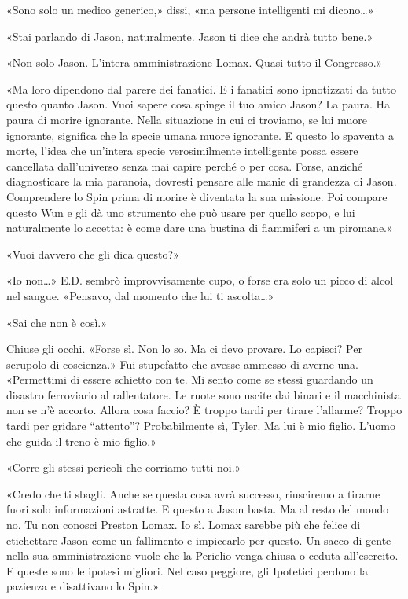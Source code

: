 «Sono solo un medico generico,» dissi, «ma persone intelligenti mi
dicono\ldots»

«Stai parlando di Jason, naturalmente. Jason ti dice che andrà tutto
bene.»

«Non solo Jason. L'intera amministrazione Lomax. Quasi tutto il
Congresso.»

«Ma loro dipendono dal parere dei fanatici. E i fanatici sono
ipnotizzati da tutto questo quanto Jason. Vuoi sapere cosa spinge il tuo
amico Jason? La paura. Ha paura di morire ignorante. Nella situazione in
cui ci troviamo, se lui muore ignorante, significa che la specie umana
muore ignorante. E questo lo spaventa a morte, l'idea che un'intera
specie verosimilmente intelligente possa essere cancellata dall'universo
senza mai capire perché o per cosa. Forse, anziché diagnosticare la mia
paranoia, dovresti pensare alle manie di grandezza di Jason. Comprendere
lo Spin prima di morire è diventata la sua missione. Poi compare questo
Wun e gli dà uno strumento che può usare per quello scopo, e lui
naturalmente lo accetta: è come dare una bustina di fiammiferi a un
piromane.»

«Vuoi davvero che gli dica questo?»

«Io non\ldots» E.D. sembrò improvvisamente cupo, o forse era solo un
picco di alcol nel sangue. «Pensavo, dal momento che lui ti
ascolta\ldots»

«Sai che non è così.»

Chiuse gli occhi. «Forse sì. Non lo so. Ma ci devo provare. Lo capisci?
Per scrupolo di coscienza.» Fui stupefatto che avesse ammesso di averne
una. «Permettimi di essere schietto con te. Mi sento come se stessi
guardando un disastro ferroviario al rallentatore. Le ruote sono uscite
dai binari e il macchinista non se n'è accorto. Allora cosa faccio? È
troppo tardi per tirare l'allarme? Troppo tardi per gridare ``attento''?
Probabilmente sì, Tyler. Ma lui è mio figlio. L'uomo che guida il treno
è mio figlio.»

«Corre gli stessi pericoli che corriamo tutti noi.»

«Credo che ti sbagli. Anche se questa cosa avrà successo, riusciremo a
tirarne fuori solo informazioni astratte. E questo a Jason basta. Ma al
resto del mondo no. Tu non conosci Preston Lomax. Io sì. Lomax sarebbe
più che felice di etichettare Jason come un fallimento e impiccarlo per
questo. Un sacco di gente nella sua amministrazione vuole che la
Perielio venga chiusa o ceduta all'esercito. E queste sono le ipotesi
migliori. Nel caso peggiore, gli Ipotetici perdono la pazienza e
disattivano lo Spin.»

